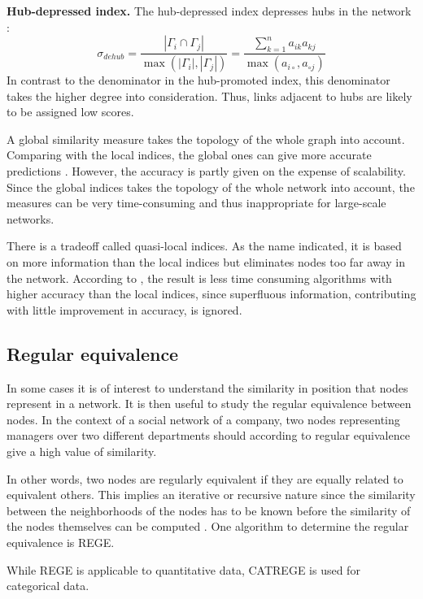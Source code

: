 \textbf{Hub-depressed index.} The hub-depressed index depresses hubs in the network \citep{fouss2016algorithms}:
\begin{equation}
    \label{dehub}
    \sigma_{dehub} = \frac{|\Gamma_i \cap \Gamma_j|}{\max(|\Gamma_i|,|\Gamma_j|)} = \frac{\sum_{k=1}^n a_{ik}a_{kj}}{\max(a_{i \circ },a_{\circ j})}
\end{equation}
In contrast to the denominator in the hub-promoted index, this denominator takes the higher degree into consideration. Thus, links adjacent to hubs are likely to be assigned low scores. 

A global similarity measure takes the topology of the whole graph into account. Comparing with the local indices, the global ones can give more accurate predictions \citep{lu2011}. However, the accuracy is partly given on the expense of scalability. Since the global indices takes the topology of the whole network into account, the measures can be very time-consuming and thus inappropriate for large-scale networks. 

There is a tradeoff called quasi-local indices. As the name indicated, it is based on more information than the local indices but eliminates nodes too far away in the network. According to \citet{lu2011}, the result is less time consuming algorithms with higher accuracy than the local indices, since superfluous information, contributing with little improvement in accuracy, is ignored.

\subsection{Regular equivalence}
In some cases it is of interest to understand the similarity in position that nodes represent in a network.  It is then useful to study the regular equivalence between nodes. In the context of a social network of a company, two nodes representing managers over two different departments should according to regular equivalence give a high value of similarity. 

In other words, two nodes are regularly equivalent if they are equally related to equivalent others. This implies an iterative or recursive nature since the similarity between the neighborhoods of the nodes has to be known before the similarity of the nodes themselves can be computed \cite{leicht2006}. One algorithm to determine the regular equivalence is REGE. 

While REGE is applicable to quantitative data, CATREGE is used for categorical data. 


